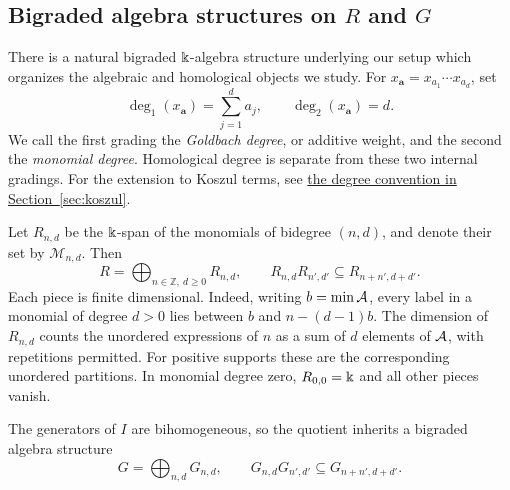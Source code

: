 \subsection{Bigraded algebra structures on \texorpdfstring{$R$}{R} and \texorpdfstring{$G$}{G}}
There is a natural bigraded $\Bbbk$-algebra structure underlying our setup
which organizes the algebraic and homological objects we study. For
$x_{\boldsymbol a}=x_{a_1}\cdots x_{a_d}$, set
\[
 \deg_1(x_{\boldsymbol a})=\sum_{j=1}^d a_j,
 \qquad \deg_2(x_{\boldsymbol a})=d.
\]
We call the first grading the \emph{Goldbach degree}, or additive weight,
and the second the \emph{monomial degree}. Homological degree is
separate from these two internal gradings. For the extension to Koszul
terms, see \hyperref[setup:koszul-grading]{the degree convention in
Section~\ref*{sec:koszul}}.

Let $R_{n,d}$ be the $\Bbbk$-span of the monomials of bidegree $(n,d)$,
and denote their set by $\mathcal M_{n,d}$. Then
\[
 R=\bigoplus_{n\in\mathbb Z,\ d\ge0}R_{n,d},\qquad
 R_{n,d}R_{n',d'}\subseteq R_{n+n',d+d'}.
\]
Each piece is finite dimensional. Indeed, writing $b=\min\mathcal A$, every
label in a monomial of degree $d>0$ lies between $b$ and
$n-(d-1)b$.
The dimension of $R_{n,d}$ counts the unordered expressions of $n$ as
a sum of $d$ elements of $\mathcal A$, with repetitions permitted. For positive
supports these are the corresponding unordered partitions. In monomial degree
zero, $R_{0,0}=\Bbbk$ and all other pieces vanish.

The generators of $I$ are bihomogeneous, so the quotient
inherits a bigraded algebra structure
\[
 G=\bigoplus_{n,d}G_{n,d},\qquad
 G_{n,d}G_{n',d'}\subseteq G_{n+n',d+d'}.
\]

